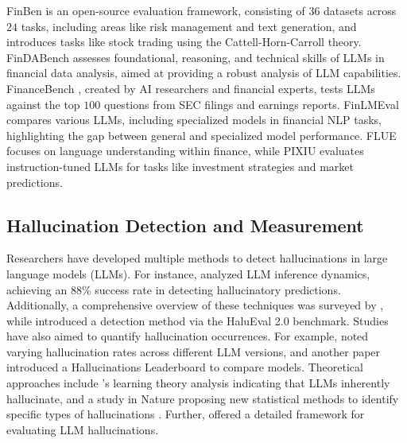 FinBen \citep{xie2024finbenholisticfinancialbenchmark} is an open-source evaluation framework, consisting of 36 datasets across $24$ tasks, including areas like risk management and text generation, and introduces tasks like stock trading using the Cattell-Horn-Carroll theory. FinDABench \citep{liu2024findabenchbenchmarkingfinancialdata} assesses foundational, reasoning, and technical skills of LLMs in financial data analysis, aimed at providing a robust analysis of LLM capabilities. FinanceBench \citep{islam2023financebenchnewbenchmarkfinancial}, created by AI researchers and financial experts, tests LLMs against the top $100$ questions from SEC filings and earnings reports.
FinLMEval \citep{guo2023chatgptfinancialexpertevaluating} compares various LLMs, including specialized models in financial NLP tasks, highlighting the gap between general and specialized model performance. FLUE focuses on language understanding within finance, while PIXIU \citep{xie2023pixiulargelanguagemodel} evaluates instruction-tuned LLMs for tasks like investment strategies and market predictions.

\subsection{Hallucination Detection and Measurement}
Researchers have developed multiple methods to detect hallucinations in large language models (LLMs). For instance, \citet{jiang2024cost} analyzed LLM inference dynamics, achieving an 88\% success rate in detecting hallucinatory predictions. Additionally, a comprehensive overview of these techniques was surveyed by \citet{du2023quantifying}, while \citet{xu2024measuring} introduced a detection method via the HaluEval 2.0 benchmark. Studies have also aimed to quantify hallucination occurrences. For example, \citet{boulila2024hallucination} noted varying hallucination rates across different LLM versions, and another paper \citep{hong2024hallucinations} introduced a Hallucinations Leaderboard to compare models. Theoretical approaches include \citet{xu2024dawn}'s learning theory analysis indicating that LLMs inherently hallucinate, and a study in Nature proposing new statistical methods to identify specific types of hallucinations \citep{jiang2024large}. Further, \citet{ji2024anah} offered a detailed framework for evaluating LLM hallucinations. 
